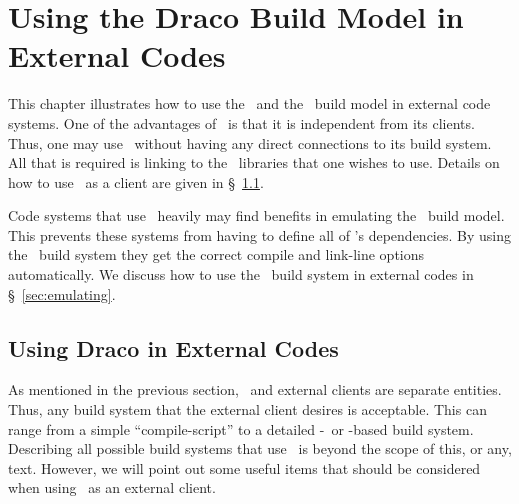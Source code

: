 
\chapter{Using the Draco Build Model in External Codes}
\label{chap:extern}

This chapter illustrates how to use the \draco\ and the \draco\ build
model in external code systems.  One of the advantages of \draco\ is
that it is independent from its clients.  Thus, one may use \draco\ 
without having any direct connections to its build system.  All that
is required is linking to the \draco\ libraries that one wishes to
use.  Details on how to use \draco\ as a client are given in
\S~\ref{sec:using}.

Code systems that use \draco\ heavily may find benefits in emulating
the \draco\ build model.  This prevents these systems from having to
define all of \draco's dependencies.  By using the \draco\ build
system they get the correct compile and link-line options
automatically.  We discuss how to use the \draco\ build system in
external codes in \S~\ref{sec:emulating}.


\section{Using Draco in External Codes}
\label{sec:using}

As mentioned in the previous section, \draco\ and external clients are
separate entities.  Thus, any build system that the external client
desires is acceptable.  This can range from a simple
``compile-script'' to a detailed \autoconf-\gmake\ or \cmake-based build system.
Describing all possible build systems that use \draco\ is beyond the
scope of this, or any, text.  However, we will point out some useful
items that should be considered when using \draco\ as an external
client.

